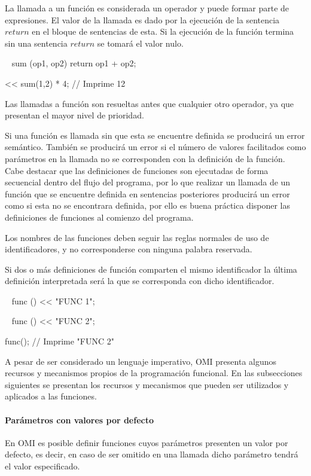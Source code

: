 La llamada a un función es considerada un operador y puede formar parte de expresiones. El
valor de la llamada es dado por la ejecución de la sentencia $return$ en el bloque de sentencias
de esta. Si la ejecución de la función termina sin una sentencia $return$ se tomará el valor nulo. \\

\begin{myverbatim}
   ~ sum (op1, op2) { 
      return op1 + op2;
   }
   
   << sum(1,2) * 4; // Imprime 12
\end{myverbatim} 

Las llamadas a función son resueltas antes que cualquier otro operador, ya que presentan el mayor nivel de prioridad. 

Si una función es llamada sin que esta se encuentre definida se producirá un error semántico. También se producirá 
un error si el número de valores facilitados como parámetros en la llamada no se corresponden con la definición de la función. Cabe destacar 
que las definiciones de funciones son ejecutadas de forma secuencial dentro del flujo del programa, por lo que realizar 
un llamada de un función que se encuentre definida en sentencias posteriores producirá un error como si esta no
se encontrara definida, por ello es buena práctica disponer las definiciones de funciones al comienzo del programa.

Los nombres de las funciones deben seguir las reglas normales de uso de identificadores, y no corresponderse con ninguna
palabra reservada.

Si dos o más definiciones de función comparten el mismo identificador la última definición interpretada será la que se corresponda
con dicho identificador. \\

\begin{myverbatim}
   ~ func () { 
      << "FUNC 1";
   }
   
   ~ func () { 
      << "FUNC 2";
   }
   
   func(); // Imprime "FUNC 2"
\end{myverbatim} 

A pesar de ser considerado un lenguaje imperativo, OMI presenta algunos recursos y mecanismos propios de la programación funcional. En las 
subsecciones siguientes se presentan los recursos y mecanismos que pueden ser utilizados y aplicados a las funciones. 

\paragraph{Parámetros con valores por defecto}
En OMI es posible definir funciones cuyos parámetros presenten un valor por defecto, es decir, en caso de ser omitido en una llamada
dicho parámetro tendrá el valor especificado. 

